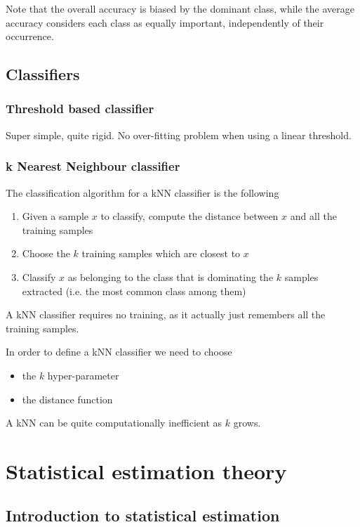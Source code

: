 \documentclass[oneside,onecolumn]{report}
\begin{document}
Note that the overall accuracy is biased by the dominant class, while the average accuracy considers each class as equally important, independently of their occurrence.


\clearpage
\section{Classifiers}

\subsection{Threshold based classifier}
Super simple, quite rigid.
No over-fitting problem when using a linear threshold.

\subsection{k Nearest Neighbour classifier}

The classification algorithm for a kNN classifier is the following

\begin{enumerate}
    \item Given a sample $x$ to classify, compute the distance between $x$ and all the training samples
    \item Choose the $k$ training samples which are closest to $x$
    \item Classify $x$ as belonging to the class that is dominating the $k$ samples extracted (i.e. the most common class among them)
\end{enumerate}

A kNN classifier requires no training, as it actually just remembers all the training samples.

In order to define a kNN classifier we need to choose
\begin{itemize}
    \item the $k$ hyper-parameter
    \item the distance function
\end{itemize}

A kNN can be quite computationally inefficient as $k$ grows.


\clearpage
\chapter{Statistical estimation theory}
\section{Introduction to statistical estimation}
\end{document}
